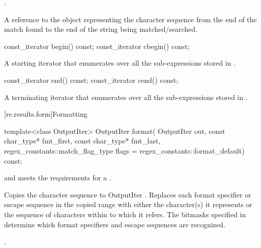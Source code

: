 \begin{itemdescr}
\pnum
\expects
{}.

\pnum
\returns
A reference to the  object representing the
character sequence from the end of the match found to the end of the
string being matched/searched.
\end{itemdescr}

%
\begin{itemdecl}
const_iterator begin() const;
const_iterator cbegin() const;
\end{itemdecl}

\begin{itemdescr}
\pnum
\returns
A starting iterator that enumerates over all the
sub-expressions stored in .
\end{itemdescr}

%
\begin{itemdecl}
const_iterator end() const;
const_iterator cend() const;
\end{itemdecl}

\begin{itemdescr}
\pnum
\returns
A terminating iterator that enumerates over all the
sub-expressions stored in .
\end{itemdescr}

[re.results.form]{Formatting}

%
\begin{itemdecl}
template<class OutputIter>
  OutputIter format(
    OutputIter out,
    const char_type* fmt_first, const char_type* fmt_last,
    regex_constants::match_flag_type flags = regex_constants::format_default) const;
\end{itemdecl}

\begin{itemdescr}
\pnum
\expects
{} and  meets the requirements for a
.

\pnum
\effects
Copies the character sequence  to
OutputIter .  Replaces each format specifier or escape
sequence in the copied range with either the character(s) it represents or
the sequence of characters within  to which it refers.
The bitmasks specified in  determine which format
specifiers and escape sequences are recognized.

\pnum
\returns
{}.
\end{itemdescr}

